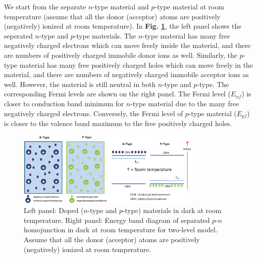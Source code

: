 \documentclass[a4paper, 12pt, titlepage,oneside,drop]{kthesis}
\begin{document}
We start from the separate $n$-type material and $p$-type material at room temperature (assume that all the donor (acceptor) atoms are positively (negatively) ionized at room temperature). In \textbf{Fig. \ref{dopedmaterials}},
the left panel shows the seperated $n$-type and $p$-type materials. The $n$-type
material has many free negatively charged electrons which can move freely inside the material, and there are numbers of positively charged immobile donor ions as well. Similarly, the $p$-type material has many free positively
charged holes which can move freely in the material, and there are numbers of negatively charged immobile acceptor ions as well. However, the material is still neutral in both $n$-type and $p$-type.
The corresponding Fermi levels are shown on the right panel. The Fermi level ($E_{nf}$) is closer to conduction band minimum for $n$-type material due to the many free 
negatively charged electrons. Conversely, the Fermi level of $p$-type material ($E_{pf}$) is closer to the valence band maximum to the free positively charged holes.

\begin{figure}[H]
    \begin{center}
            \includegraphics[width=0.8\textwidth,clip]{sepratepn.eps}
     \end{center}
    \caption{Left panel: Doped ($n$-type and $p$-type) materials in dark at room temperature. Right panel: Energy band diagram of separated $p$-$n$ homojunction in dark at room temperature for two-level model. Assume that all the donor (acceptor) atoms are 
    positively (negatively) ionized at room temperature.}      
    \label{dopedmaterials}
\end{figure}
\end{document}
